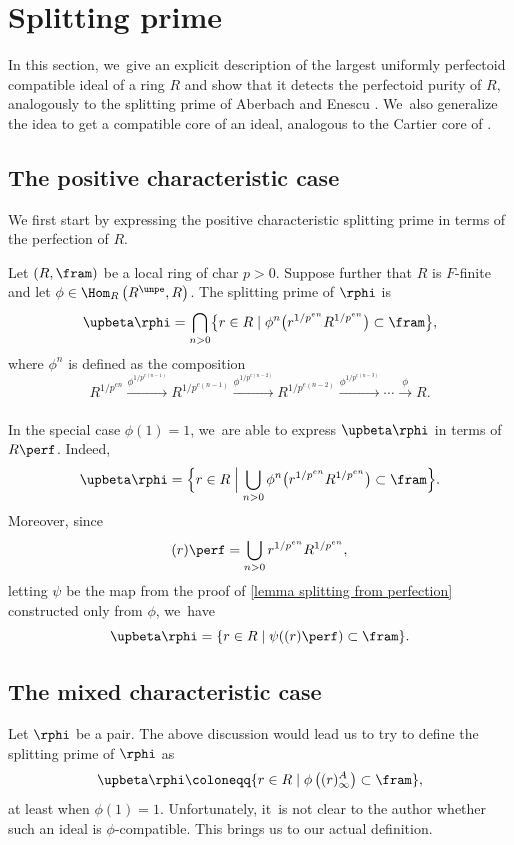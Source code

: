 \section{Splitting prime}
In this section, we~give an explicit description of the largest uniformly perfectoid compatible ideal of a ring $R$ and show that it detects the perfectoid purity of $R$, analogously to the splitting prime of Aberbach and Enescu \cite{AberbachEnescuStructureOfFPure}. We~also generalize the idea to get a compatible core of an ideal, analogous to the Cartier core of \cite{BadillaCespedesFInvariantsSRRings,BrosowskyCartierCoreMap,CarvajalFayolleTameRamificationCFPS}.

\subsection{The positive characteristic case}
We first start by expressing the positive characteristic splitting prime in terms of the perfection of $R$.

\begin{definition}
Let $(R,\fram)$ be a local ring of char $p>0$. Suppose further that $R$ is $F$-finite and let $\phi\in \Hom_R\left(R^\unpe,R\right)$. The splitting prime of $\rphi$ is
\[
\upbeta\rphi=\bigcap_{n>0} \bigl\{r\in R\mid \phi^n\bigl(r^{1/p^{en}}R^{1/p^{en}} \bigr)\subset \fram \bigr\},
\]
where $\phi^n$ is defined as the composition
\[
R^{1/p^{en}}\xrightarrow[]{\phi^{1/p^{e(n-1)}}}R^{1/p^{e(n-1)}}\xrightarrow[]{\phi^{1/p^{e(n-2)}}}R^{1/p^{e(n-2)}}\xrightarrow[]{\phi^{1/p^{e(n-3)}}}\cdots \xrightarrow[]{\phi} R.
\]
\end{definition}

In the special case $\phi(1)=1$, we~are able to express $\upbeta\rphi$ in terms of $R\perf$. Indeed,
\[
\upbeta\rphi = \Bigl\{r\in R \Bigm| \bigcup_{n>0}\phi^n\bigl(r^{1/p^{en}}R^{1/p^{en}}\bigr)\subset \fram \Bigr\}.
\]
Moreover, since
\[
(r)\perf=\bigcup_{n>0} r^{1/p^{en}}R^{1/p^{en}},
\]
letting $\psi$ be the map from the proof of \autoref{lemma splitting from perfection} constructed only from $\phi$, we~have
\[
\upbeta\rphi=\{r\in R\mid \psi((r)\perf)\subset \fram\}.
\]

\subsection{The mixed characteristic case}
Let $\rphi$ be a pair. The above discussion would lead us to try to define the splitting prime of $\rphi$ as
\[
\upbeta\rphi\coloneqq\{r\in R\mid \phi\left((r)_\infty^A\right)\subset \fram\},
\]
at least when $\phi(1)=1$.
Unfortunately, it~is not clear to the author whether such an ideal is $\phi$-compatible. This brings us to our actual definition.

